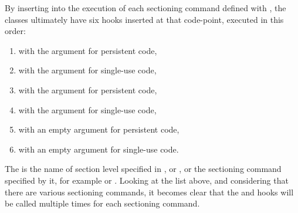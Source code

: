 \begin{Example}
  By inserting %
   into the execution of each
  sectioning command defined with
  , the \KOMAScript{}
  classes ultimately have six hooks inserted at that code-point, executed in
  this order:
  \begin{enumerate}
    \item {} with the argument 
    for persistent code,
    \item {} with the argument 
    for single-use code,
    \item {} with the argument  for
    persistent code,
    \item {} with the argument  for
    single-use code,
    \item {} with an empty argument for
    persistent code,
    \item {} with an empty argument for
    single-use code.
  \end{enumerate}
  The  is the name of section level specified in
  ,
   or
  , or the sectioning
  command specified by it, for example  or
  . Looking at the list above, and considering that there
  are various sectioning commands, it becomes clear that the 
  and  hooks will be called multiple times for each
  sectioning command.%
\end{Example}%
%
\EndIndexGroup

